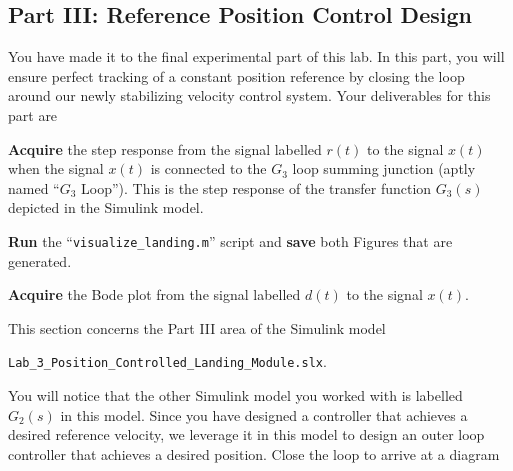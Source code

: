 \subsection{Part III: Reference Position Control Design}\label{Lab:3:Part:III}
You have made it to the final experimental part of this lab.
In this part, you will ensure perfect tracking of a constant position reference by closing the loop around our newly stabilizing velocity control system.
Your deliverables for this part are
%
\begin{deliverable}[label={del:lab3:g3:1}]
   \textbf{Acquire} the step response from the signal labelled \(r(t)\) to the signal \(x(t)\) when the signal \(x(t)\) is connected to the \(G_3\) loop summing junction (aptly named ``\(G_3\) Loop'').
   This is the step response of the transfer function \(G_3(s)\) depicted in the Simulink model.
\end{deliverable}
%
\begin{deliverable}[label={del:lab3:g3:2}]
   \textbf{Run} the ``\texttt{visualize\_landing.m}'' script and \textbf{save} both Figures that are generated.
\end{deliverable}
%
\begin{deliverable}[label={del:lab3:g3:3}]
   \textbf{Acquire} the Bode plot from the signal labelled \(d(t)\) to the signal \(x(t).\)
\end{deliverable}
%
This section concerns the Part III area of the Simulink model
\begin{center}
  \texttt{Lab\_3\_Position\_Controlled\_Landing\_Module.slx}.
\end{center}
You will notice that the other Simulink model you worked with is labelled \(G_2(s)\) in this model.
Since you have designed a controller that achieves a desired reference velocity, we leverage it in this model to design an outer loop controller that achieves a desired position.
Close the loop to arrive at a diagram
%
